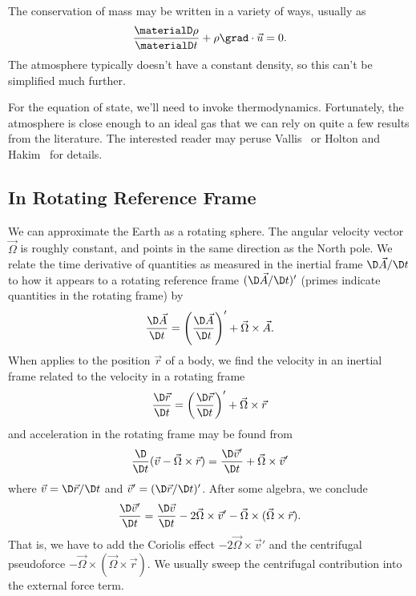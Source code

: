 The conservation of mass may be written in a variety of ways, usually as
\begin{equation}
  \frac{\materialD\rho}{\materialD t}+\rho\grad\cdot\vec{u}=0.
\end{equation}
The atmosphere typically doesn't have a constant density, so this can't
be simplified much further.

For the equation of state, we'll need to invoke thermodynamics.
Fortunately, the atmosphere is close enough to an ideal gas that we can
rely on quite a few results from the literature. The interested reader
may peruse Vallis~\cite{vallis_2017} or Holton and
Hakim~\cite{holton2013dynamicMeteorology} for details.

\subsection{In Rotating Reference Frame}

We can approximate the Earth as a rotating sphere. The angular velocity
vector $\vec{\Omega}$ is roughly constant, and points in the same
direction as the North pole. We relate the time derivative of quantities
as measured in the inertial frame $\D\vec{A}/\D t$ to how it appears to a
rotating reference frame $(\D\vec{A}/\D t)'$ (primes indicate quantities
in the rotating frame) by
\begin{equation}
  \frac{\D\vec{A}}{\D t} = \left(\frac{\D\vec{A}}{\D t}\right)' + \vec{\Omega}\times\vec{A}.
\end{equation}
When applies to the position $\vec{r}$ of a body, we find the velocity
in an inertial frame related to the velocity in a rotating frame
\begin{equation}
  \frac{\D\vec{r}}{\D t} = \left(\frac{\D\vec{r}}{\D t}\right)' + \vec{\Omega}\times\vec{r}
\end{equation}
and acceleration in the rotating frame may be found from
\begin{equation}
  \frac{\D}{\D t}(\vec{v} - \vec{\Omega}\times\vec{r})
  = \frac{\D\vec{v}'}{\D t}+\vec{\Omega}\times\vec{v}'
\end{equation}
where $\vec{v} = \D\vec{r}/\D t$ and $\vec{v}' = (\D\vec{r}/\D t)'$.
After some algebra, we conclude
\begin{equation}
  \frac{\D\vec{v}'}{\D t}
  = \frac{\D \vec{v}}{\D t}
    - 2\vec{\Omega}\times\vec{v}'
    - \vec{\Omega}\times(\vec{\Omega}\times\vec{r}).
\end{equation}
That is, we have to add the Coriolis effect
$-2\vec{\Omega}\times\vec{v}'$ and the centrifugal pseudoforce
$-\vec{\Omega}\times(\vec{\Omega}\times\vec{r})$. We usually sweep the
centrifugal contribution into the external force term.

